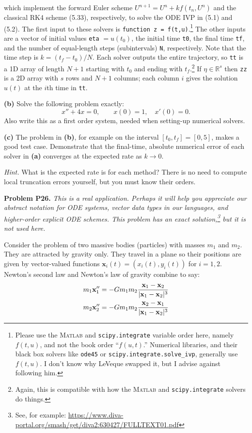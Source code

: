 \documentclass[12pt]{amsart}
\newcommand{\bx}{\mathbf{x}}
\newcommand{\RR}{\mathbb{R}}
\newcommand{\Matlab}{\textsc{Matlab}\xspace}
\newcommand{\prob}[1]{\bigskip\noindent\textbf{#1}\quad }
\newcommand{\epart}[1]{\medskip\noindent\textbf{(#1)}\quad }
\begin{document}
\noindent which implement the forward Euler scheme $U^{n+1}=U^n+kf(t_n,U^n)$ and the classical RK4 scheme (5.33), respectively, to solve the ODE IVP in (5.1) and (5.2).  The first input to these solvers is \texttt{function z = f(t,u)}.\footnote{Please use the \Matlab and \texttt{scipy.integrate} variable order here, namely $f(t,u)$, and not the book order ``$f(u,t)$.''  Numerical libraries, and their black box solvers like \texttt{ode45} or \texttt{scipy.integrate.solve\_ivp}, generally use $f(t,u)$.  I don't know why LeVeque swapped it, but I advise against following him.}  The other inputs are a vector of initial values \texttt{eta} $= u(t_0)$, the initial time \texttt{t0}, the final time \texttt{tf}, and the number of equal-length steps (subintervals) \texttt{N}, respectively.  Note that the time step is $k = (t_f-t_0)/N$.  Each solver outputs the entire trajectory, so \texttt{tt} is a 1D array of length $N+1$ starting with $t_0$ and ending with $t_f$.\footnote{Again, this is compatible with how the \Matlab and \texttt{scipy.integrate} solvers do things.}  If $\eta\in\RR^s$ then \texttt{zz} is a 2D array with $s$ rows and $N+1$ columns; each column $i$ gives the solution $u(t)$ at the $i$th time in \texttt{tt}.

\epart{b}  Solve the following problem exactly:
    $$x'' + 4 x = 0, \qquad x(0)=1, \quad x'(0)=0.$$
Also write this as a first order system, needed when setting-up numerical solvers.

\epart{c} The problem in \textbf{(b)}, for example on the interval $[t_0,t_f] = [0,5]$, makes a good test case.  Demonstrate that the final-time, absolute numerical error of each solver in \textbf{(a)} converges at the expected rate as $k\to 0$.

\medskip
\noindent \emph{Hint.} What is the expected rate is for each method?  There is no need to compute local truncation errors yourself, but you must know their orders.


\prob{Problem P26.}  \emph{This is a real application.  Perhaps it will help you appreciate our abstract notation for ODE systems, vector data types in our languages, and higher-order explicit ODE schemes.  This problem has an exact solution,\footnote{See, for example: {\scriptsize\url{https://www.diva-portal.org/smash/get/diva2:630427/FULLTEXT01.pdf}}} but it is not used here.}

\medskip
\noindent Consider the problem of two massive bodies (particles) with masses $m_1$ and $m_2$.  They are attracted by gravity only.  They travel in a plane so their positions are given by vector-valued functions $\bx_i(t) = (x_i(t),y_i(t))$ for $i=1,2$.  Newton's second law and Newton's law of gravity combine to say:
\begin{align}
m_1 \bx_1'' &= - G m_1 m_2 \frac{\bx_1 - \bx_2}{|\bx_1 - \bx_2|^3} \label{twobody} \\
m_2 \bx_2'' &= - G m_1 m_2 \frac{\bx_2 - \bx_1}{|\bx_1 - \bx_2|^3} \notag
\end{align}
\end{document}
